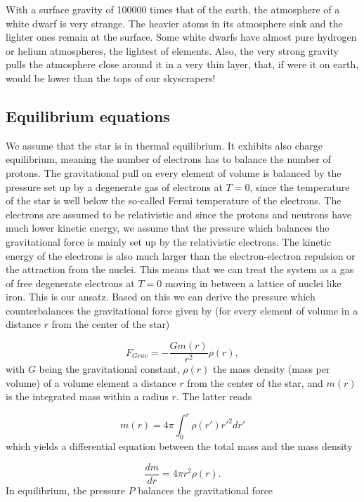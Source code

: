 \documentclass[%
oneside,                 %
final,                   %
10pt]{article}
\begin{document}
With a surface gravity of 100000 times that of the earth, the atmosphere of 
a white dwarf is very strange. The heavier atoms in its atmosphere sink and the lighter ones remain at the surface. 
Some white dwarfs have almost pure hydrogen or helium atmospheres, the lightest of elements. 
Also, the very strong gravity pulls the atmosphere close around it in a very thin layer, that, 
if were it on earth, would be lower than the tops of our skyscrapers!

\subsection*{Equilibrium equations}

We assume that the star is in thermal equilibrium. It exhibits also charge equilibrium, meaning the number of electrons has to balance the number of protons. The gravitational pull 
on every element of volume is balanced by the pressure set up by a degenerate gas of electrons
at $T=0$, since the temperature of the star is well below the so-called Fermi temperature of the 
electrons. 
The electrons are assumed to be relativistic and since the protons and neutrons have much lower
kinetic energy, we assume that the pressure which balances the gravitational force is mainly
set up by the relativistic electrons. The kinetic energy of the electrons is also much larger
than the electron-electron repulsion or the attraction from the nuclei. This means that we can treat 
the system as a gas of free degenerate electrons at $T=0$ moving in between a lattice of nuclei like  
iron. This is our ansatz. 
Based on this we can derive the pressure which counterbalances the gravitational force given by
(for every element of volume in a distance $r$ from the center of the star)

\begin{equation*}
F_{Grav}=-\frac{Gm(r)}{r^{2}}\rho(r),
\end{equation*}
with $G$ being the  gravitational constant, $\rho (r)$ the mass density  (mass per volume) of a volume
element a distance $r$ from the center of the star,
and  $m(r)$ is the integrated mass within a radius $r$. The latter reads

\begin{equation*}
m(r)=4\pi\int_{0}^{r}\rho (r')r'^{2}dr'
\end{equation*}
which yields a differential equation between the total mass and the mass density

\begin{equation*}
\frac{dm}{dr}=4\pi r^{2}\rho (r).
\end{equation*}
In equilibrium, the pressure $P$ balances the gravitational force
\end{document}
